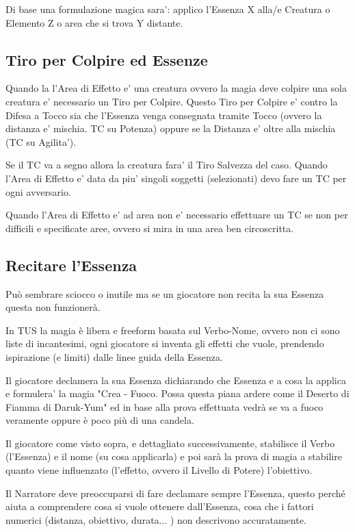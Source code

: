 \documentclass[a4paper,11pt,twoside,openany]{book}
\begin{document}
Di base una formulazione magica sara': applico l'Essenza X alla/e Creatura o Elemento Z o area che si trova Y distante.

\subsection{Tiro per Colpire ed Essenze}

Quando la l'Area di Effetto e' una creatura ovvero la magia deve colpire una sola creatura e' necessario un Tiro per Colpire.
Questo Tiro per Colpire e' contro la Difesa a Tocco sia che l'Essenza venga consegnata tramite Tocco (ovvero la distanza e' mischia. TC su Potenza) oppure se la Distanza e' oltre alla mischia (TC su Agilita').

Se il TC va a segno allora la creatura fara' il Tiro Salvezza del caso.
Quando l'Area di Effetto e' data da piu' singoli soggetti (selezionati) devo fare un TC per ogni avversario.

Quando l'Area di Effetto e' ad area non e' necessario effettuare un TC se non per difficili e specificate aree, ovvero si mira in una area ben circoscritta.


\subsection{Recitare l'Essenza}

\label{recitare-lessenza}

Può sembrare sciocco o inutile ma se un giocatore non recita la sua Essenza questa non funzionerà.

In TUS la magia è libera e freeform basata sul Verbo-Nome, ovvero non ci sono liste di incantesimi, ogni giocatore si inventa gli effetti che vuole, prendendo ispirazione (e limiti) dalle linee guida della Essenza.

Il giocatore declamera la sua Essenza dichiarando che Essenza e a cosa la applica e formulera' la magia "Crea - Fuoco. Possa questa piana ardere come il Deserto di Fiamma di Daruk-Yum" ed in base alla prova effettuata vedrà se va a fuoco veramente oppure è poco più di una candela.

Il giocatore come visto sopra, e dettagliato successivamente, stabilisce il Verbo (l'Essenza) e il nome (su cosa applicarla) e poi sarà la prova di magia a stabilire quanto viene influenzato (l'effetto, ovvero il Livello di Potere) l'obiettivo.

Il Narratore deve preoccuparsi di fare declamare sempre l'Essenza, questo perché aiuta a comprendere cosa si vuole ottenere dall'Essenza, cosa che i fattori numerici (distanza, obiettivo, durata... ) non descrivono accuratamente.
\end{document}
